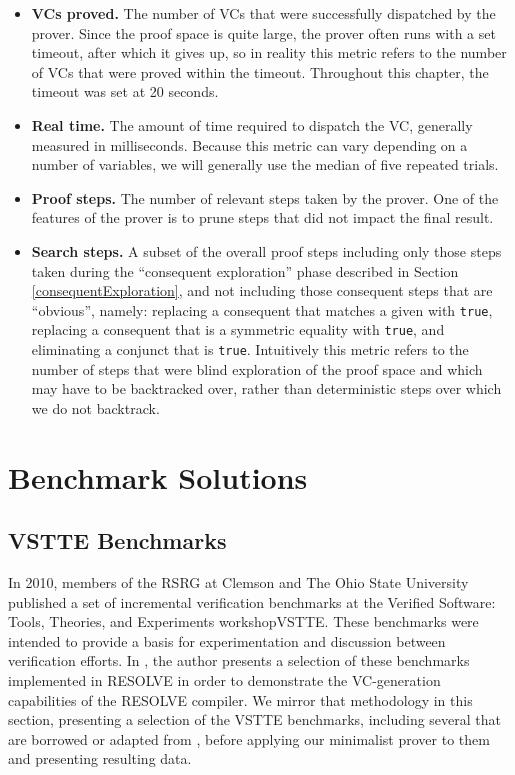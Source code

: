 \begin{itemize}
	\item \textbf{VCs proved.}  The number of VCs that were successfully dispatched by the prover.  Since the proof space is quite large, the prover often runs with a set timeout, after which it gives up, so in reality this metric refers to the number of VCs that were proved within the timeout.  Throughout this chapter, the timeout was set at 20 seconds.
	\item \textbf{Real time.}  The amount of time required to dispatch the VC, generally measured in milliseconds.  Because this metric can vary depending on a number of variables, we will generally use the median of five repeated trials.
	\item \textbf{Proof steps.}  The number of relevant steps taken by the prover.  One of the features of the prover is to prune steps that did not impact the final result.
	\item \textbf{Search steps.}  A subset of the overall proof steps including only those steps taken during the ``consequent exploration'' phase described in Section \ref{consequentExploration}, and not including those consequent steps that are ``obvious'', namely: replacing a consequent that matches a given with \texttt{true}, replacing a consequent that is a symmetric equality with \texttt{true}, and eliminating a conjunct that is \texttt{true}.  Intuitively this metric refers to the number of steps that were blind exploration of the proof space and which may have to be backtracked over, rather than deterministic steps over which we do not backtrack.
\end{itemize}


\section{Benchmark Solutions\label{canProve}}

	\subsection{VSTTE Benchmarks}
In 2010, members of the RSRG at Clemson and The Ohio State University published a set of incremental verification benchmarks at the Verified Software: Tools, Theories, and Experiments workshopVSTTE\cite{benchmarks}.  These benchmarks were intended to provide a basis for experimentation and discussion between verification efforts.  In \cite{heatherDissertation}, the author presents a selection of these benchmarks implemented in RESOLVE in order to demonstrate the VC-generation capabilities of the RESOLVE compiler.  We mirror that methodology in this section, presenting a selection of the VSTTE benchmarks, including several that are borrowed or adapted from \cite{heatherDissertation}, before applying our minimalist prover to them and presenting resulting data.
